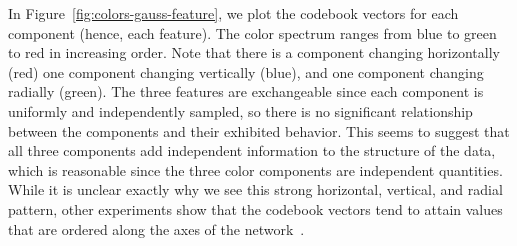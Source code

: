In Figure~\ref{fig:colors-gauss-feature},
we plot the codebook vectors for each component (hence, each feature).
The color spectrum ranges from blue to green to red in increasing order. 
Note that there is a component changing horizontally (red)
one component changing vertically (blue),
and one component changing radially (green).
The three features are exchangeable 
since each component is uniformly and independently sampled,
so there is no significant relationship between the components and their exhibited behavior.
This seems to suggest that all three components add independent information
to the structure of the data, which is reasonable since the three color components are independent quantities.
While it is unclear exactly why we see this strong horizontal, vertical, and radial pattern,
other experiments show that the codebook vectors tend to attain values 
that are ordered along the axes of the network~\cite{kohonen:1990}.
